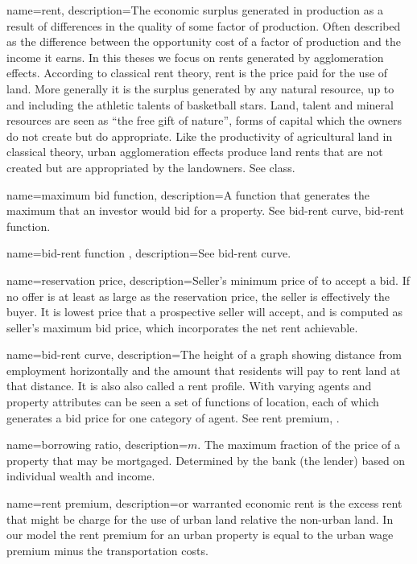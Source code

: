 {
name=rent,
description={The economic  surplus generated in production as a result of differences in the quality of some factor of production. Often described as the difference between the opportunity cost of a factor of production and the income it earns. In this theses we focus on rents generated by \glspl{agglomeration effect}. According to \gls{classical rent theory}, rent is the price paid for the use of land. More generally it is the  surplus generated by any natural resource, up to and including the athletic talents of basketball stars.\cite{lackmanClassicalBaseModern1976} Land, talent and mineral resources are seen as ``the free gift of nature'', forms of capital which the owners do not create but do appropriate. Like the productivity of agricultural land in classical theory,  urban \gls{agglomeration effect}s produce land rents that are not created but are appropriated by the landowners. See \gls{class}.}
}

{
name=maximum bid function,
description={A function that generates the maximum that an investor would bid for a property.  See \gls{bid-rent curve}, \gls{bid-rent function}.}
}

{
name=bid-rent function ,
description={See \gls{bid-rent curve}.}
}

{
name=reservation price,
description={Seller's minimum price of to accept a bid. If no offer is at least as large as the reservation price, the seller is effectively the buyer. It is lowest price that a prospective seller will accept, and is computed as seller's maximum bid price, which incorporates the net rent achievable.}
}

{
name=bid-rent curve,
description={The height of a graph showing distance from employment horizontally and the amount that residents will pay to rent land at that distance. It is also also called a \gls{rent profile}. With varying agents and property attributes can be seen a set of functions of location, each of which  generates a bid price for one category of agent.   See \gls{rent premium}, .}
}

{
name=borrowing ratio,
description={$m$. The maximum fraction of the price of a property that may be mortgaged. Determined by the bank (the lender) based on individual wealth and income. }
}

{
name=rent premium,
description={or \gls{warranted economic rent} is the excess rent  that might be charge for the use of urban land relative the non-urban land. In our model the rent premium for an urban property is equal to the urban wage premium minus the transportation costs. }
}


